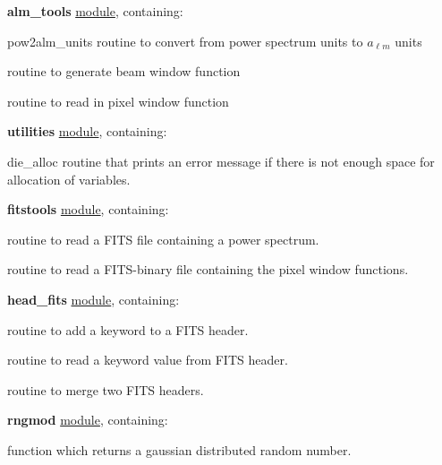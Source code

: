 \begin{modules}
  \begin{sulist}{} %
  \item[\textbf{alm\_tools}] \underline{module}, containing:
	\item[pow2alm\_units] routine to convert from power spectrum units to
  $a_{\ell m}$ units
	\item[\htmlref{generate\_beam}{sub:generate_beam}] routine to generate beam window function
	\item[\htmlref{pixel\_window}{sub:pixel_window}] routine to read in pixel window function
  \item[\textbf{utilities}] \underline{module}, containing:
        \item[die\_alloc] routine that prints an error message if there is not enough space for allocation of variables.
  \item[\textbf{fitstools}] \underline{module}, containing:
        \item[\htmlref{fits2cl}{sub:fits2cl}] routine to read a FITS
  file containing a power spectrum.
        \item[\htmlref{read\_dbintab}{sub:read_dbintab}] routine to read a FITS-binary file containing the pixel window functions.
  \item[\textbf{head\_fits}] \underline{module}, containing:
       \item[\htmlref{add\_card}{sub:add_card}] routine to add a keyword to a FITS header.
       \item[\htmlref{get\_card}{sub:get_card}] routine to read a keyword value from
  FITS header.
       \item[\htmlref{merge\_headers}{sub:merge_headers}] routine to merge two FITS headers.
  \item[\textbf{rngmod}] \underline{module}, containing:
       \item[\htmlref{rand\_gauss}{sub:rand_gauss}] function which returns a gaussian distributed random
  number. 
  \end{sulist}
\end{modules}

